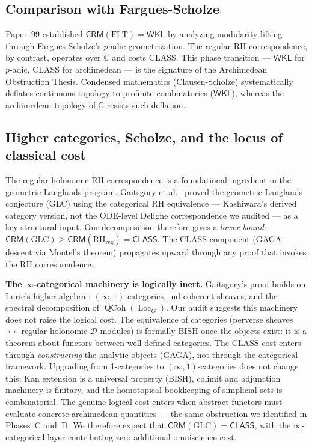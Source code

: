 \documentclass[11pt,a4paper]{article}
\theoremstyle{plain}
\theoremstyle{definition}
\newcommand{\BISH}{\textsf{BISH}}
\newcommand{\WKL}{\textsf{WKL}}
\newcommand{\CLASS}{\textsf{CLASS}}
\newcommand{\CRM}{\textsf{CRM}}
\newcommand{\C}{\mathbb{C}}
\DeclareMathOperator{\QCoh}{QCoh}
\DeclareMathOperator{\Loc}{Loc}
\begin{document}
\subsection{Comparison with Fargues-Scholze}

Paper~99 established $\CRM(\mathrm{FLT}) = \WKL$ by analyzing modularity lifting through Fargues-Scholze's $p$-adic geometrization.
The regular RH correspondence, by contrast, operates over $\C$ and costs \CLASS.
This phase transition --- $\WKL$ for $p$-adic, \CLASS{} for archimedean --- is the signature of the Archimedean Obstruction Thesis.
Condensed mathematics (Clausen-Scholze) systematically deflates continuous topology to profinite combinatorics ($\WKL$), whereas the archimedean topology of $\C$ resists such deflation.

\subsection{Higher categories, Scholze, and the locus of classical cost}

The regular holonomic RH correspondence is a foundational ingredient in the geometric Langlands program.
Gaitsgory et al.\ \cite{Gaitsgory2024} proved the geometric Langlands conjecture (GLC) using the categorical RH equivalence --- Kashiwara's derived category version, not the ODE-level Deligne correspondence we audited --- as a key structural input.
Our decomposition therefore gives a \emph{lower bound}: $\CRM(\mathrm{GLC}) \ge \CRM(\mathrm{RH}_{\mathrm{reg}}) = \CLASS$.
The \CLASS{} component (GAGA descent via Montel's theorem) propagates upward through any proof that invokes the RH correspondence.

\medskip\noindent\textbf{The $\infty$-categorical machinery is logically inert.}
Gaitsgory's proof builds on Lurie's higher algebra \cite{Lurie2017}: $(\infty,1)$-categories, ind-coherent sheaves, and the spectral decomposition of $\QCoh(\Loc_G)$.
Our audit suggests this machinery does not raise the logical cost.
The equivalence of categories (perverse sheaves $\leftrightarrow$ regular holonomic $\mathcal{D}$-modules) is formally \BISH{} once the objects exist: it is a theorem about functors between well-defined categories.
The \CLASS{} cost enters through \emph{constructing} the analytic objects (GAGA), not through the categorical framework.
Upgrading from 1-categories to $(\infty,1)$-categories does not change this: Kan extension is a universal property (\BISH), colimit and adjunction machinery is finitary, and the homotopical bookkeeping of simplicial sets is combinatorial.
The genuine logical cost enters when abstract functors must evaluate concrete archimedean quantities --- the same obstruction we identified in Phases~C and~D.
We therefore expect that $\CRM(\mathrm{GLC}) = \CLASS$, with the $\infty$-categorical layer contributing zero additional omniscience cost.
\end{document}
